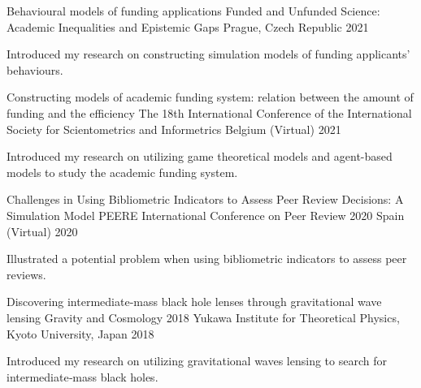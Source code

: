 

\begin{cventries}


  \cventry
    {Behavioural models of funding applications} %
    {Funded and Unfunded Science: Academic Inequalities and Epistemic Gaps} %
    {Prague, Czech Republic} %
    {2021} %
    {
      \begin{cvitems} %
        \item {Introduced my research on constructing simulation models of funding applicants' behaviours.}
      \end{cvitems}
    }

  \cventry
    {Constructing models of academic funding system: relation between the amount of funding and the efficiency} %
    {The 18th International Conference of the International Society for Scientometrics and Informetrics} %
    {Belgium (Virtual)} %
    {2021} %
    {
      \begin{cvitems} %
        \item {Introduced my research on utilizing game theoretical models and agent-based models to study the academic funding system.}
      \end{cvitems}
    }

  \cventry
    {Challenges in Using Bibliometric Indicators to Assess Peer Review Decisions: A Simulation Model} %
    {PEERE International Conference on Peer Review 2020} %
    {Spain (Virtual)} %
    {2020} %
    {
      \begin{cvitems} %
        \item {Illustrated a potential problem when using bibliometric indicators to assess peer reviews.}
      \end{cvitems}
    }

  \cventry
    {Discovering intermediate‑mass black hole lenses through gravitational wave lensing} %
    {Gravity and Cosmology 2018} %
    {Yukawa Institute for Theoretical Physics, Kyoto University, Japan} %
    {2018} %
    {
      \begin{cvitems} %
        \item {Introduced my research on utilizing gravitational waves lensing to search for intermediate‑mass black holes.}
      \end{cvitems}
    }


\end{cventries}
